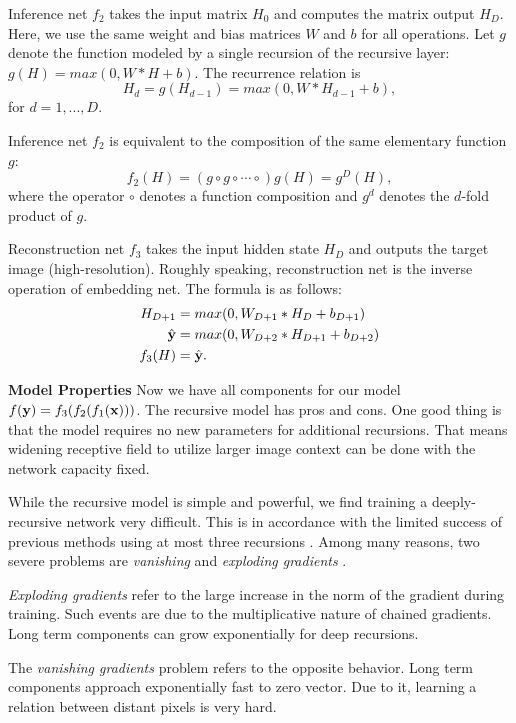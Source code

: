 \documentclass[10pt,twocolumn,letterpaper]{article}
\begin{document}
Inference net $f_2$ takes the input matrix $H_0$ and computes the matrix output $H_{D}$. Here, we use the same weight and bias matrices $W$ and $b$ for all operations.  Let $g$ denote the function modeled by a single recursion of the recursive layer: $g(H)=max(0,W*H+b)$. The recurrence relation is  
\begin{equation}
 H_d = g(H_{d-1}) = max(0,W*H_{d-1}+b),
\end{equation}
for $d = 1, ..., D$. 

Inference net $f_2$ is equivalent to the composition of the same elementary function $g$: 
\begin{equation}
f_2(H) = (g \circ g \circ \cdots \circ) g(H) =  g^{D}(H),
\end{equation}
where the operator $\circ$ denotes a function composition and $g^{d}$ denotes the $d$-fold product of $g$.

Reconstruction net $f_3$ takes the input hidden state $H_D$ and outputs the target image (high-resolution). Roughly speaking, reconstruction net is the inverse operation of embedding net. The formula is as follows:
\begin{align}
	H_{D+1} &= max(0, W_{D+1}*H_D + b_{D+1})\\
	\hat{{\bf y}} &= max(0, W_{D+2}*H_{D+1} + b_{D+2})\\
	f_3(H) &= \hat{{\bf y}}.
\end{align}

\textbf{Model Properties} Now we have all components for our model $f({\bf y}) = f_3(f_2 (f_1({\bf x})))$. The recursive model has pros and cons. One good thing is that the model requires no new parameters for additional recursions. That means widening receptive field to utilize larger image context can be done with the network capacity fixed. 

While the recursive model is simple and powerful, we find training a deeply-recursive network very difficult. This is in accordance with the limited success of previous methods using at most three recursions \cite{Liang_2015_CVPR}.  Among many reasons, two severe problems are \textit{vanishing} and \textit{exploding gradients} \cite{bengio1994learning, pascanu2013difficulty}.  

\textit{Exploding gradients} refer to the large increase in the norm
of the gradient during training. Such events are due to
the multiplicative nature of chained gradients. Long term components can grow exponentially for deep recursions.


The
\textit{vanishing gradients} problem refers to the opposite behavior. Long term components approach exponentially
fast to zero vector. Due to it, learning a relation between distant pixels is very hard.
\end{document}
